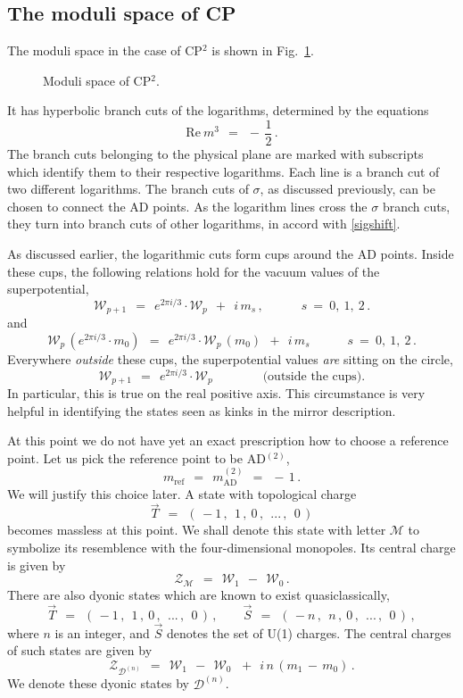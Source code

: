 \documentclass[epsfig,12pt]{article}
\def\beq{\begin{equation}}
\def\eeq{\end{equation}}
\def\beq{\begin{equation}}
\def\eeq{\end{equation}}
\newcommand{\mc}[1]{\mathcal{#1}}
\newcommand{\W}{\mathcal{W}}
\begin{document}
\subsection{The moduli space of CP}

	The moduli space in the case of CP$^2$ is shown in Fig.~\ref{fcp2}. 
\begin{figure}
\begin{center}
\epsfxsize=8.0cm
\caption{Moduli space of CP$^2$.}
\label{fcp2}
\end{center}
\end{figure}
	It has hyperbolic branch cuts of the logarithms, determined by the equations
\beq
	\text{Re}~m^3 ~~=~~ -\,\frac{1}{2}\,.
\eeq
	The branch cuts belonging to the physical plane are marked with subscripts which
	identify them to their respective logarithms.
	Each line is a branch cut of two different logarithms. 
	The branch cuts of $ \sigma $, as discussed previously, can be chosen to connect the AD points.
	As the logarithm lines cross the $ \sigma $ branch cuts, they turn into branch
	cuts of other logarithms, in accord with \eqref{sigshift}.

	As discussed earlier, the logarithmic cuts form cups around the AD points. 
	Inside these cups, the following relations hold for the vacuum values of the superpotential,
\beq
	\W_{p+1} ~~=~~ e^{2 \pi i / 3} \cdot \W_p ~~+~~ i\, m_s\,, \qquad\quad s~=~0,~1,~2\,.
\eeq
	and
\beq
	\W_p\, (e^{2 \pi i / 3} \cdot m_0) ~~=~~ e^{2 \pi i / 3} \cdot \W_p\, (m_0) ~~+~~ i\, m_s
	\qquad\quad s~=~0,~1,~2\,.
\eeq
	Everywhere {\it outside} these cups, the superpotential values {\it are} sitting on the circle,
\beq
	\W_{p+1} ~~=~~ e^{2 \pi i / 3} \cdot \W_p
	\qquad\qquad \text{(outside the cups)}.
\eeq
	In particular, this is true on the real positive axis.
	This circumstance is very helpful in identifying the states seen as kinks in the mirror description.

	At this point we do not have yet an exact prescription how to choose a reference point.
	Let us pick the reference point to be AD$^{(2)}$, 
\beq
	m_\text{ref} ~~=~~ m_\text{AD}^{(2)} ~~=~~ -\,1\,.
\eeq
	We will justify this choice later.
	A state with topological charge
\beq
	\vec{T} ~~=~~ (\, -1\,,~~ 1\,,~ 0 \,,~~ ...\,,~~ 0 \,)
\eeq
	becomes massless at this point.
	We shall denote this state with letter $ \mc{M} $ to symbolize its resemblence with 
	the four-dimensional monopoles. 
	Its central charge is given by
\beq
	\mc{Z_M} ~~=~~ \W_1 ~~-~~ \W_0\,.
\eeq
	There are also dyonic states which are known to exist quasiclassically,
\beq
	\vec{T} ~~=~~ (\, -1\,,~~ 1\,,~ 0 \,,~~ ...\,,~~ 0 \,)\,, \qquad
	\vec{S} ~~=~~ (\, -n\,,~~ n\,,~ 0 \,,~~ ...\,,~~ 0 \,)\,, 
\eeq
	where $ n $ is an integer, and $ \vec{S} $ denotes the set of U(1) charges.
	The central charges of such states are given by 
\beq
	\mc{Z}_{\mc{D}^{(n)}} ~~=~~ \W_1 ~~-~~ \W_0\, ~~+~~ i\, n\, ( m_1 \,-\, m_0 ) \,.
\eeq
	We denote these dyonic states by $ \mc{D}^{(n)} $.
\end{document}
